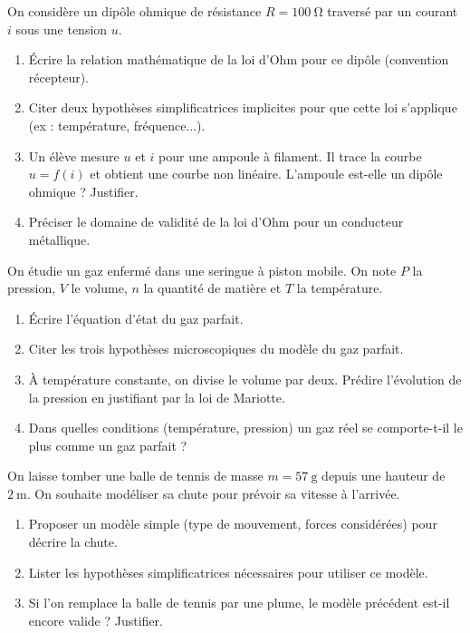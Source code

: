 \documentclass[11pt]{article}
\begin{document}
\begin{exercice}
On considère un dipôle ohmique de résistance $R = \SI{100}{\ohm}$ traversé par un courant $i$ sous une tension $u$.
\begin{enumerate}
    \item Écrire la relation mathématique de la loi d'Ohm pour ce dipôle (convention récepteur).
    \item Citer deux hypothèses simplificatrices implicites pour que cette loi s'applique (ex : température, fréquence...).
    \item Un élève mesure $u$ et $i$ pour une ampoule à filament. Il trace la courbe $u = f(i)$ et obtient une courbe non linéaire. L'ampoule est-elle un dipôle ohmique ? Justifier.
    \item Préciser le domaine de validité de la loi d'Ohm pour un conducteur métallique.
\end{enumerate}
\end{exercice}

\begin{exercice}
On étudie un gaz enfermé dans une seringue à piston mobile. On note $P$ la pression, $V$ le volume, $n$ la quantité de matière et $T$ la température.
\begin{enumerate}
    \item Écrire l'équation d'état du gaz parfait.
    \item Citer les trois hypothèses microscopiques du modèle du gaz parfait.
    \item À température constante, on divise le volume par deux. Prédire l'évolution de la pression en justifiant par la loi de Mariotte.
    \item Dans quelles conditions (température, pression) un gaz réel se comporte-t-il le plus comme un gaz parfait ?
\end{enumerate}
\end{exercice}

\begin{exercice}
On laisse tomber une balle de tennis de masse $m = \SI{57}{\gram}$ depuis une hauteur de $\SI{2}{\metre}$. On souhaite modéliser sa chute pour prévoir sa vitesse à l'arrivée.
\begin{enumerate}
    \item Proposer un modèle simple (type de mouvement, forces considérées) pour décrire la chute.
    \item Lister les hypothèses simplificatrices nécessaires pour utiliser ce modèle.
    \item Si l'on remplace la balle de tennis par une plume, le modèle précédent est-il encore valide ? Justifier.
\end{enumerate}
\end{exercice}
\end{document}
